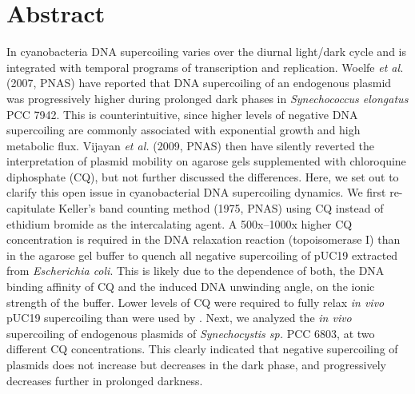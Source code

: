 \documentclass[10pt,a4]{article}
\newcommand{\remove}[1]{\begingroup\color{gray}\endgroup}
\begin{document}
\section*{Abstract}
In cyanobacteria DNA supercoiling varies over the diurnal light/dark
cycle and is integrated with temporal programs of transcription and
replication. Woelfe \textit{et al.} (2007, PNAS) have reported that
DNA supercoiling of an endogenous plasmid was progressively higher
during prolonged dark phases in \textit{Synechococcus elongatus} PCC
7942.  This is counterintuitive, since higher levels of negative DNA
supercoiling are commonly associated with exponential growth and high
metabolic flux. Vijayan \textit{et al.} (2009, PNAS) then have
silently reverted the interpretation of plasmid mobility on agarose
gels supplemented with chloroquine diphosphate (CQ), but not further
discussed the differences.
%
Here, we set out to clarify this open issue in cyanobacterial DNA
supercoiling dynamics. We first re-capitulate Keller's band counting
method (1975, PNAS) using CQ instead of ethidium bromide as the
intercalating agent.  A 500x--1000x higher CQ concentration is
required in the DNA relaxation reaction (topoisomerase I) than in the
agarose gel buffer to quench all negative supercoiling of pUC19
extracted from \textit{Escherichia coli}. This is likely due to the
dependence of both, the DNA binding affinity of CQ and the induced DNA
unwinding angle, on the ionic strength of the buffer. Lower levels of
CQ were required to fully relax \textit{in vivo} pUC19 supercoiling
than were used by \citet{Woelfle2007}. Next, we analyzed the
\textit{in vivo} supercoiling of endogenous plasmids of
\remove{\textit{Synechococcus elongatus} and} \textit{Synechocystis sp.}
PCC 6803, at two different CQ concentrations.  This clearly indicated
that negative supercoiling of plasmids does not increase but decreases
in the dark phase, and progressively decreases further in prolonged
darkness.

\linenumbers
\end{document}
